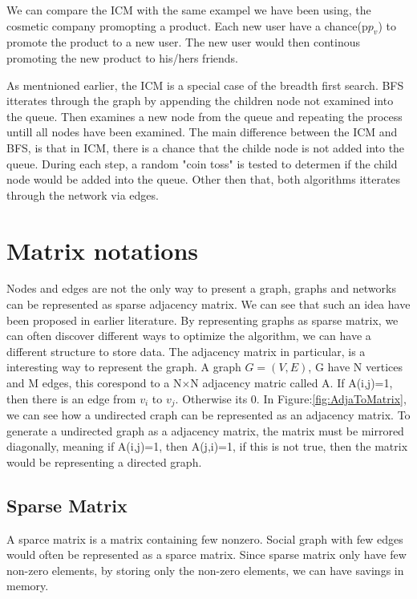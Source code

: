 {We can compare the ICM with the same exampel we have been using, the cosmetic company promopting a product. Each new user have a chance(p$p_v$) to promote the product to a new user. The new user would then continous promoting the new product to his/hers friends. 

As mentnioned earlier, the ICM is a special case of the breadth first search. BFS itterates through the graph by appending the children node not examined into the queue. Then examines a new node from the queue and repeating the process untill all nodes have been examined. The main difference between the ICM and BFS, is that in ICM, there is a chance that the childe node is not added into the queue. During each step, a random "coin toss" is tested to determen if the child node would be added into the queue. Other then that, both algorithms itterates through the network via edges.

\section{Matrix notations}
Nodes and edges are not the only way to present a graph, graphs and networks can be represented as sparse adjacency matrix\cite{MathTolAgo}. We can see that such an idea have been proposed in earlier literature\cite{McAndrew1963}. By representing graphs as sparse matrix, we can often discover different ways to optimize the algorithm, we can have a different structure to store data. The adjacency matrix in particular, is a interesting way to represent the graph. A graph $G =(V,E)$, G have N vertices and M edges, this corespond to a N$\times$N adjacency matric called A. If A(i,j)=1, then there is an edge from $v_i$ to $v_j$. Otherwise its 0. In Figure:\ref{fig:AdjaToMatrix}, we can see how a undirected craph can be represented as an adjacency matrix. To generate a undirected graph as a adjacency matrix, the matrix must be mirrored diagonally, meaning if A(i,j)=1, then A(j,i)=1, if this is not true, then the matrix would be representing a directed graph.

\subsection{Sparse Matrix}
A sparce matrix is a matrix containing few nonzero. Social graph with few edges would often be represented as a sparce matrix. Since sparse matrix only have few non-zero elements, by storing only the non-zero elements, we can have savings in memory.

}
